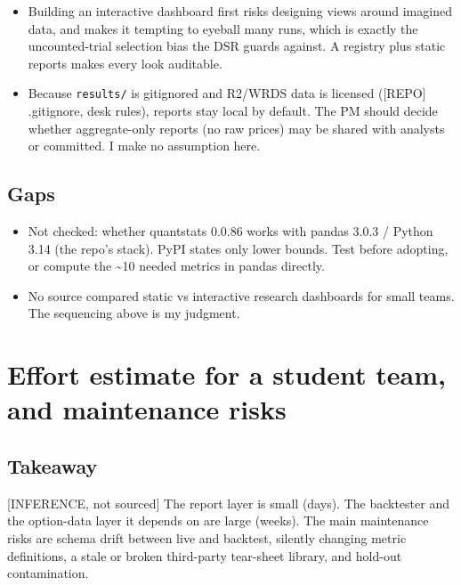 \documentclass{article}
\begin{document}
\begin{itemize}

\item [INFERENCE] Building an interactive dashboard first risks designing views around imagined data, and makes it tempting to eyeball many runs, which is exactly the uncounted-trial selection bias the DSR guards against. A registry plus static reports makes every look auditable.

\item [INFERENCE] Because \texttt{results/\allowbreak{}} is gitignored and R2/\allowbreak{}WRDS data is licensed ([REPO] .gitignore, desk rules), reports stay local by default. The PM should decide whether aggregate-only reports (no raw prices) may be shared with analysts or committed. I make no assumption here.

\end{itemize}

\subsection{Gaps}

\begin{itemize}

\item Not checked: whether quantstats 0.0.86 works with pandas 3.0.3 /\allowbreak{} Python 3.14 (the repo's stack). PyPI states only lower bounds. Test before adopting, or compute the \textasciitilde{}10 needed metrics in pandas directly.

\item No source compared static vs interactive research dashboards for small teams. The sequencing above is my judgment.

\end{itemize}

\section{Effort estimate for a student team, and maintenance risks}

\subsection{Takeaway}

[INFERENCE, not sourced] The report layer is small (days). The backtester and the option-data layer it depends on are large (weeks). The main maintenance risks are schema drift between live and backtest, silently changing metric definitions, a stale or broken third-party tear-sheet library, and hold-out contamination.
\end{document}
